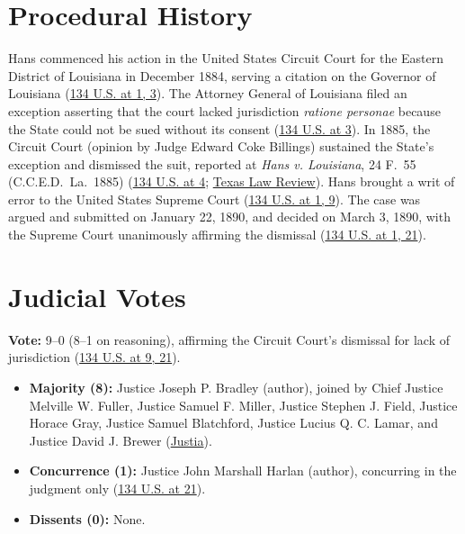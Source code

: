 \documentclass[12pt]{article}
\begin{document}
\section{Procedural History}
Hans commenced his action in the United States Circuit Court for the Eastern District of Louisiana in December 1884, serving a citation on the Governor of Louisiana (\href{https://supreme.justia.com/cases/federal/us/134/1/}{134 U.S. at 1, 3}). The Attorney General of Louisiana filed an exception asserting that the court lacked jurisdiction \textit{ratione personae} because the State could not be sued without its consent (\href{https://supreme.justia.com/cases/federal/us/134/1/}{134 U.S. at 3}). In 1885, the Circuit Court (opinion by Judge Edward Coke Billings) sustained the State's exception and dismissed the suit, reported at \textit{Hans v. Louisiana}, 24 F.\ 55 (C.C.E.D.\ La.\ 1885) (\href{https://supreme.justia.com/cases/federal/us/134/1/}{134 U.S. at 4}; \href{https://texaslawreview.org/state-sovereign-immunity-after-the-revolution/}{Texas Law Review}). Hans brought a writ of error to the United States Supreme Court (\href{https://supreme.justia.com/cases/federal/us/134/1/}{134 U.S. at 1, 9}). The case was argued and submitted on January 22, 1890, and decided on March 3, 1890, with the Supreme Court unanimously affirming the dismissal (\href{https://supreme.justia.com/cases/federal/us/134/1/}{134 U.S. at 1, 21}).

\section{Judicial Votes}
\textbf{Vote:} 9--0 (8--1 on reasoning), affirming the Circuit Court's dismissal for lack of jurisdiction (\href{https://supreme.justia.com/cases/federal/us/134/1/}{134 U.S. at 9, 21}).
\begin{itemize}
\item \textbf{Majority (8):} Justice Joseph P. Bradley (author), joined by Chief Justice Melville W. Fuller, Justice Samuel F. Miller, Justice Stephen J. Field, Justice Horace Gray, Justice Samuel Blatchford, Justice Lucius Q. C. Lamar, and Justice David J. Brewer (\href{https://supreme.justia.com/cases/federal/us/134/1/}{Justia}).
\item \textbf{Concurrence (1):} Justice John Marshall Harlan (author), concurring in the judgment only (\href{https://supreme.justia.com/cases/federal/us/134/1/}{134 U.S. at 21}).
\item \textbf{Dissents (0):} None.
\end{itemize}
\end{document}
